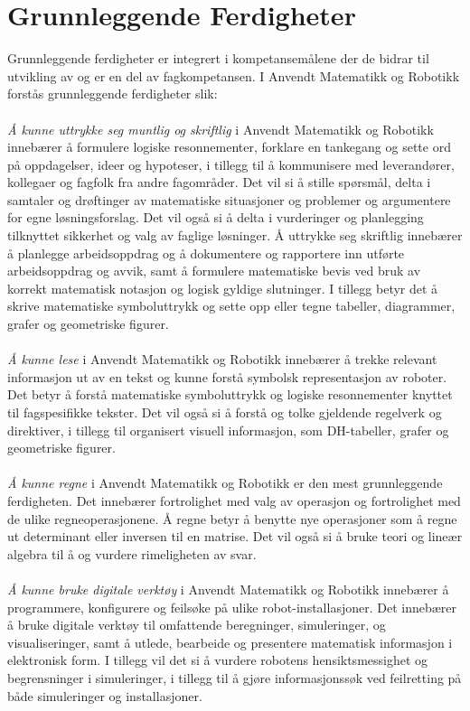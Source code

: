 \section*{Grunnleggende Ferdigheter} \label{Sec: GrunnleggendeFerdigheter}


Grunnleggende ferdigheter er integrert i kompetansemålene der de bidrar til utvikling av og er en del av fagkompetansen. I Anvendt Matematikk og Robotikk forstås grunnleggende ferdigheter slik:\\\\
\emph{Å kunne uttrykke seg muntlig og skriftlig} i Anvendt Matematikk og Robotikk innebærer å formulere logiske resonnementer, forklare en tankegang og sette ord på oppdagelser, ideer og hypoteser, i tillegg til å kommunisere med leverandører, kollegaer og fagfolk fra andre fagområder. Det vil si å stille spørsmål, delta i samtaler og drøftinger av matematiske situasjoner og problemer og argumentere for egne løsningsforslag. Det vil også si å delta i vurderinger og planlegging tilknyttet sikkerhet og valg av faglige løsninger. Å uttrykke seg skriftlig innebærer å planlegge arbeidsoppdrag og å dokumentere og rapportere inn utførte arbeidsoppdrag og avvik, samt å formulere matematiske bevis ved bruk av korrekt matematisk notasjon og logisk gyldige slutninger. I tillegg betyr det å skrive matematiske symboluttrykk og sette opp eller tegne tabeller, diagrammer, grafer og geometriske figurer.\\\\
\emph{Å kunne lese} i Anvendt Matematikk og Robotikk innebærer å trekke relevant informasjon ut av en tekst og kunne forstå symbolsk representasjon av roboter. Det betyr å forstå matematiske symboluttrykk og logiske resonnementer knyttet til fagspesifikke tekster. Det vil også si å forstå og tolke gjeldende regelverk og direktiver, i tillegg til organisert visuell informasjon, som DH-tabeller, grafer og geometriske figurer.\\\\
\emph{Å kunne regne} i Anvendt Matematikk og Robotikk er den mest grunnleggende ferdigheten. Det innebærer fortrolighet med valg av operasjon og fortrolighet med de ulike regneoperasjonene. Å regne betyr å benytte nye operasjoner som å regne ut determinant eller inversen til en matrise. Det vil også si å bruke teori og lineær algebra til å og vurdere rimeligheten av svar.\\\\
\emph{Å kunne bruke digitale verktøy} i Anvendt Matematikk og Robotikk innebærer å programmere, konfigurere og feilsøke på ulike robot-installasjoner. Det innebærer å bruke digitale verktøy til omfattende beregninger, simuleringer, og visualiseringer, samt å utlede, bearbeide og presentere matematisk informasjon i elektronisk form. I tillegg vil det si å vurdere robotens hensiktsmessighet og begrensninger i simuleringer, i tillegg til å gjøre informasjonssøk ved feilretting på både simuleringer og installasjoner.
